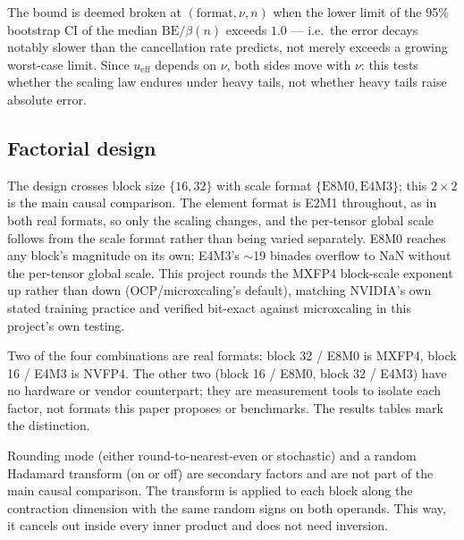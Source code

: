  The bound is deemed broken at $(\mathrm{format}, \nu, n)$ when the
lower limit of the 95\% bootstrap CI of the median $\mathrm{BE}/\beta(n)$ exceeds
$1.0$ --- i.e.\ the error decays notably slower than the cancellation rate
predicts, not merely exceeds a growing worst-case limit. Since $u_{\mathrm{eff}}$
depends on $\nu$, both sides move with $\nu$: this tests whether the scaling law
endures under heavy tails, not whether heavy tails raise absolute error.

\subsection{Factorial design}
\label{sec:method:design}

The design crosses block size $\{16, 32\}$ with scale format
$\{\mathrm{E8M0}, \mathrm{E4M3}\}$; this $2\times2$ is the main causal comparison.
The element format is E2M1 throughout, as in both real formats, so only the
scaling changes, and the per-tensor global scale follows from the scale format
rather than being varied separately. E8M0 reaches any block's magnitude on its
own; E4M3's $\sim$19 binades overflow to NaN without the per-tensor global scale. This project rounds the MXFP4 block-scale
exponent up rather than down (OCP/microxcaling's default), matching NVIDIA's own
stated training practice \citep{nvidia2026nvfp4} and verified bit-exact against
microxcaling in this project's own testing.

Two of the four combinations are real formats: block 32 / E8M0 is MXFP4,
block 16 / E4M3 is NVFP4. The other two (block 16 / E8M0, block 32 / E4M3) have
no hardware or vendor counterpart; they are measurement tools to isolate each
factor, not formats this paper proposes or benchmarks. The results tables mark
the distinction.

Rounding mode (either round-to-nearest-even or stochastic) and a random Hadamard
transform (on or off) are secondary factors and are not part of the main causal
comparison. The transform is applied to each block along the contraction
dimension with the same random signs on both operands. This way, it cancels out
inside every inner product and does not need inversion.

